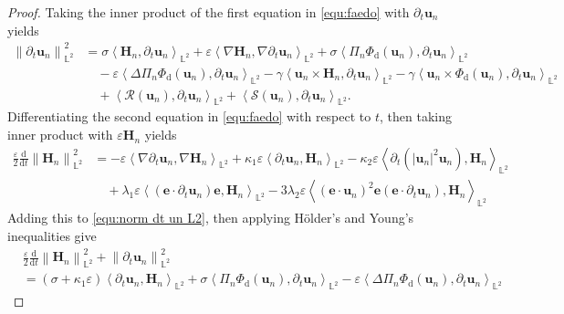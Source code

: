 \documentclass[11pt, reqno]{amsart}
\theoremstyle{definition}
\numberwithin{equation}{section}
\newcommand{\bff}{\boldsymbol}
\newcommand{\bb}{\mathbb}
\newcommand{\ddt}{\frac{\mathrm{d}}{\mathrm{d}t}}
\newcommand{\norm}[2]{\left\|{#1}\right\|_{#2}}
\newcommand{\inpro}[2]{\left\langle#1,#2\right\rangle}
\begin{document}
\begin{proof}
	Taking the inner product of the first equation in \eqref{equ:faedo} with $\partial_t \bff{u}_n$ yields
	\begin{align}\label{equ:norm dt un L2}
		\norm{\partial_t \bff{u}_n}{\bb{L}^2}^2 
		&=
		\sigma \inpro{\bff{H}_n}{\partial_t \bff{u}_n}_{\bb{L}^2}
		+
		\varepsilon \inpro{\nabla \bff{H}_n}{\nabla \partial_t \bff{u}_n}_{\bb{L}^2}
        +
        \sigma \inpro{\Pi_n\Phi_{\mathrm{d}}(\bff{u}_n)}{\partial_t \bff{u}_n}_{\bb{L}^2}
		\nonumber \\
		&\quad
		 -
		\varepsilon \inpro{\Delta \Pi_n \Phi_{\mathrm{d}}(\bff{u}_n)}{\partial_t \bff{u}_n}_{\bb{L}^2}
  		-
		\gamma \inpro{\bff{u}_n \times \bff{H}_n}{\partial_t \bff{u}_n}_{\bb{L}^2}
        -
        \gamma \inpro{\bff{u}_n \times \Phi_{\mathrm{d}}(\bff{u}_n)}{\partial_t \bff{u}_n}_{\bb{L}^2}
        \nonumber \\
        &\quad
		+
		\inpro{\mathcal{R}(\bff{u}_n)}{\partial_t\bff{u}_n}_{\bb{L}^2}
		+
		\inpro{\mathcal{S}(\bff{u}_n)}{\partial_t\bff{u}_n}_{\bb{L}^2}.
	\end{align}
	Differentiating the second equation in \eqref{equ:faedo} with respect to $t$, then taking inner product with $\varepsilon \bff{H}_n$ yields
	\begin{align*}
		\frac{\varepsilon}{2} \ddt \norm{\bff{H}_n}{\bb{L}^2}^2
		&=
		- \varepsilon
		\inpro{\nabla \partial_t \bff{u}_n}{\nabla \bff{H}_n}_{\bb{L}^2}
		+
		\kappa_1 \varepsilon \inpro{\partial_t \bff{u}_n}{\bff{H}_n}_{\bb{L}^2}
		-
		\kappa_2 \varepsilon \inpro{\partial_t (|\bff{u}_n|^2 \bff{u}_n)}{\bff{H}_n}_{\bb{L}^2}
		\\
		&\quad
		+
		\lambda_1 \varepsilon\inpro{(\bff{e}\cdot\partial_t \bff{u}_n)\bff{e}}{\bff{H}_n}_{\bb{L}^2}
        -
        3\lambda_2 \varepsilon \inpro{(\bff{e}\cdot \bff{u}_n)^2 \bff{e}(\bff{e}\cdot \partial_t \bff{u}_n)}{\bff{H}_n}_{\bb{L}^2}
	\end{align*}
	Adding this to \eqref{equ:norm dt un L2}, then applying H\"{o}lder's and Young's inequalities give
	\begin{align}\label{equ:J1 to J9}
		&\frac{\varepsilon}{2} \ddt \norm{\bff{H}_n}{\bb{L}^2}^2
		+
		\norm{\partial_t \bff{u}_n}{\bb{L}^2}^2
		\nonumber \\
		&=
		(\sigma + \kappa_1 \varepsilon) \inpro{\partial_t \bff{u}_n}{\bff{H}_n}_{\bb{L}^2}
        +
        \sigma \inpro{\Pi_n\Phi_{\mathrm{d}}(\bff{u}_n)}{\partial_t \bff{u}_n}_{\bb{L}^2}
        -
        \varepsilon \inpro{\Delta\Pi_n \Phi_{\mathrm{d}}(\bff{u}_n)}{\partial_t \bff{u}_n}_{\bb{L}^2}

\end{align}
\end{proof}
\end{document}
